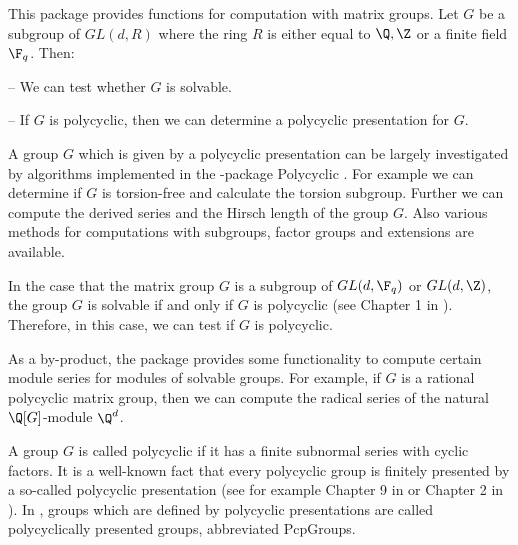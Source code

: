 


This package provides functions for computation with matrix
groups. Let $G$ be a subgroup of $GL(d,R)$ where the ring $R$ is
either equal to $\Q,\Z$ or a finite field $\F_q$.
Then: 
\beginlist
\item{--} 
    We can test whether $G$ is solvable.
\item{--}
    If $G$ is polycyclic, then we can determine a polycyclic
    presentation for $G$. 
\endlist

A group $G$ which is given by a polycyclic presentation can be largely
investigated by algorithms implemented in the {\GAP}-package
Polycyclic \cite{Polycyclic}. For example 
we can determine if $G$ is torsion-free
and calculate the torsion subgroup. Further we can compute the derived
series and the Hirsch length of the group $G$. Also various methods for
computations with subgroups, factor groups and extensions are
available.

In the case that the matrix group 
$G$ is a subgroup of $GL(d,\F_q)$ or $GL(d,\Z)$, the
group $G$ is solvable if and only if $G$ is polycyclic (see Chapter 1
in \cite{Segal}). 
Therefore, in this case, we can test if $G$ is polycyclic. 

As a by-product, the {\Polenta} package 
provides some functionality to compute certain module series for
modules of solvable groups. For example, if
$G$ is a rational polycyclic matrix group, then we can compute the 
radical series of the natural
$\Q[G]$-module $\Q^d$.  


A group $G$ is called polycyclic if it has a finite subnormal
series with cyclic 
factors. It is a well-known fact that every polycyclic group is
finitely presented by a so-called polycyclic presentation (see
for example Chapter 9 in \cite{Sims} or Chapter 2 in \cite{Polycyclic} ). 
In {\GAP}, groups which are defined by polycyclic
 presentations are called
polycyclically presented groups, abbreviated PcpGroups.
 
